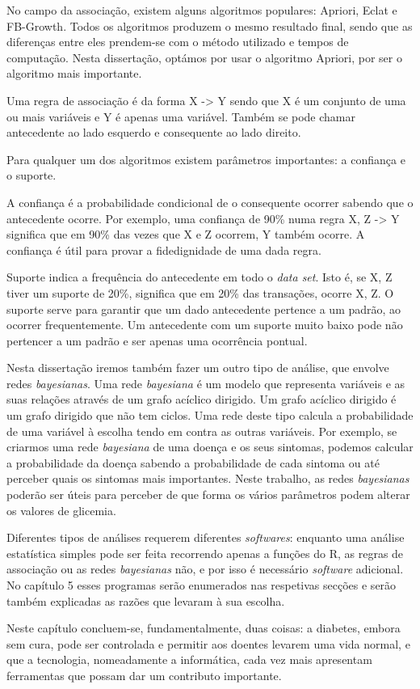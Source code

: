 No campo da associação, existem alguns algoritmos populares: Apriori, Eclat e FB-Growth. Todos os algoritmos produzem o mesmo resultado final, sendo que as diferenças entre eles prendem-se com o método utilizado e tempos de computação. Nesta dissertação, optámos por usar o algoritmo Apriori, por ser o algoritmo mais importante. 

Uma regra de associação é da forma {X} -> Y sendo que {X} é um conjunto de uma ou mais variáveis e Y é apenas uma variável. Também se pode chamar antecedente ao lado esquerdo e consequente ao lado direito.

Para qualquer um dos algoritmos existem parâmetros importantes: a confiança e o suporte.

A confiança é a probabilidade condicional de o consequente ocorrer sabendo que o antecedente ocorre. Por exemplo, uma confiança de 90\% numa regra {X, Z} -> Y significa que em 90\% das vezes que X e Z ocorrem, Y também ocorre. A confiança é útil para provar a fidedignidade de uma dada regra.

Suporte indica a frequência do antecedente em todo o \textit{data set}. Isto é, se {X, Z} tiver um suporte de 20\%, significa que em 20\% das transações, ocorre {X, Z}. O suporte serve para garantir que um dado antecedente pertence a um padrão, ao ocorrer frequentemente. Um antecedente com um suporte muito baixo pode não pertencer a um padrão e ser apenas uma ocorrência pontual.


Nesta dissertação iremos também fazer um outro tipo de análise, que envolve redes \textit{bayesianas}. Uma rede \textit{bayesiana} é um modelo que representa variáveis e as suas relações através de um grafo acíclico dirigido. Um grafo acíclico dirigido é um grafo dirigido que não tem ciclos. Uma rede deste tipo calcula a probabilidade de uma variável à escolha tendo em contra as outras variáveis. Por exemplo, se criarmos uma rede \textit{bayesiana} de uma doença e os seus sintomas, podemos calcular a probabilidade da doença sabendo a probabilidade de cada sintoma ou até perceber quais os sintomas mais importantes. Neste trabalho, as redes \textit{bayesianas} poderão ser úteis para perceber de que forma os vários parâmetros podem alterar os valores de glicemia. 

Diferentes tipos de análises requerem diferentes \textit{softwares}: enquanto uma análise estatística simples pode ser feita recorrendo apenas a funções do R, as regras de associação ou as redes \textit{bayesianas} não, e por isso é necessário \textit{software} adicional. No capítulo 5 esses programas serão enumerados nas respetivas secções e serão também explicadas as razões que levaram à sua escolha. 


Neste capítulo concluem-se, fundamentalmente, duas coisas: a diabetes, embora sem cura, pode ser controlada e permitir aos doentes levarem uma vida normal, e que a tecnologia, nomeadamente a informática, cada vez mais apresentam ferramentas que possam dar um contributo importante. 

